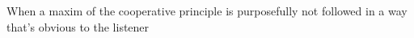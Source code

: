 When a maxim of the cooperative principle is purposefully not followed in a way that's obvious to the listener
